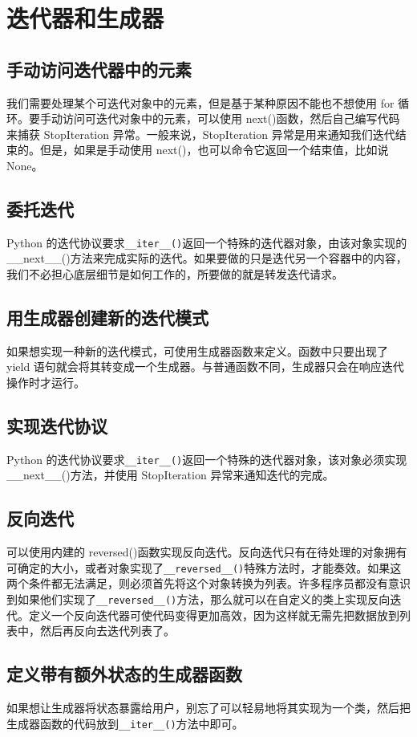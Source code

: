 \chapter{迭代器和生成器\label{ch04}}
\section{手动访问迭代器中的元素}
我们需要处理某个可迭代对象中的元素，但是基于某种原因不能也不想使用 for 循环。要手动访问可迭代对象中的元素，可以使用 next()函数，然后自己编写代码来捕获 StopIteration 异常。一般来说，StopIteration 异常是用来通知我们迭代结束的。但是，如果是手动使用 next()，也可以命令它返回一个结束值，比如说 None。

\section{委托迭代}
Python 的迭代协议要求\verb|__iter__()|返回一个特殊的迭代器对象，由该对象实现的__next__()方法来完成实际的迭代。如果要做的只是迭代另一个容器中的内容，我们不必担心底层细节是如何工作的，所要做的就是转发迭代请求。
\section{用生成器创建新的迭代模式}
如果想实现一种新的迭代模式，可使用生成器函数来定义。函数中只要出现了 yield 语句就会将其转变成一个生成器。与普通函数不同，生成器只会在响应迭代操作时才运行。
\section{实现迭代协议}
Python 的迭代协议要求\verb|__iter__()|返回一个特殊的迭代器对象，该对象必须实现__next__()方法，并使用 StopIteration 异常来通知迭代的完成。
\section{反向迭代}
可以使用内建的 reversed()函数实现反向迭代。反向迭代只有在待处理的对象拥有可确定的大小，或者对象实现了\verb|__reversed__()|特殊方法时，才能奏效。如果这两个条件都无法满足，则必须首先将这个对象转换为列表。许多程序员都没有意识到如果他们实现了\verb|__reversed__()|方法，那么就可以在自定义的类上实现反向迭代。定义一个反向迭代器可使代码变得更加高效，因为这样就无需先把数据放到列表中，然后再反向去迭代列表了。
\section{定义带有额外状态的生成器函数}
如果想让生成器将状态暴露给用户，别忘了可以轻易地将其实现为一个类，然后把生成器函数的代码放到\verb|__iter__()|方法中即可。
